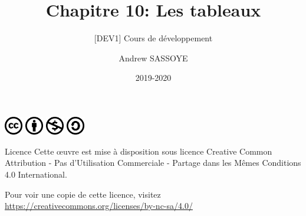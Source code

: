 \documentclass{beamer}
\title{Chapitre 10: Les tableaux}
\subtitle{\tiny [DEV1] Cours de d\'eveloppement}
\author{Andrew SASSOYE}
\date{2019-2020}
\begin{document}
	\begin{frame}
		\titlepage
	\end{frame}

	\begin{frame}
		\begin{center}
			\includegraphics[width=8mm]{./styles/images/cc}
			\includegraphics[width=8mm]{./styles/images/by}
			\includegraphics[width=8mm]{./styles/images/nc}
			\includegraphics[width=8mm]{./styles/images/sa}
		\end{center}

		\begin{block}{Licence}
			\small Cette \oe uvre est mise \`a disposition sous licence Creative Common
			Attribution - Pas d\rq Utilisation Commerciale - Partage dans les M\^emes Conditions 4.0 International.
		\end{block}

		\tiny Pour voir une copie de cette licence, visitez
		\href{https://creativecommons.org/licenses/by-nc-sa/4.0/}{https://creativecommons.org/licenses/by-nc-sa/4.0/}
	\end{frame}
\end{document}
